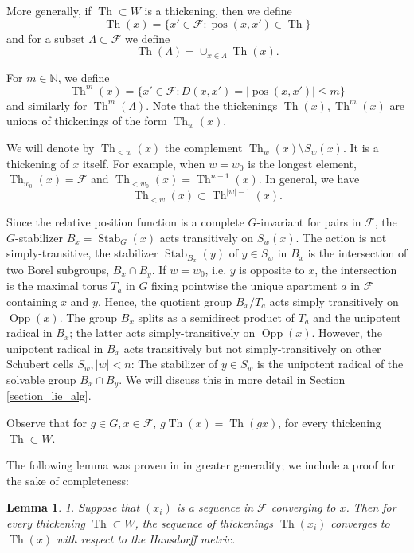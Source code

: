 \documentclass[12pt]{amsbook}%
\newtheorem{lem}[thm]{Lemma}
\theoremstyle{definition}
\theoremstyle{remark}
\numberwithin{section}{chapter}
\numberwithin{subsection}{section}
\numberwithin{figure}{chapter}
\DeclareMathOperator{\Th}{Th}
\DeclareMathOperator{\Opp}{Opp}
\DeclareMathOperator{\Stab}{Stab}
\def\bN{{\mathbb{N}}}
\def\cF{{\mathscr{F}}}
\begin{document}
{{More generally, if $\Th\subset W$ is a thickening, then we define \index{$\Th(x)$, thickening of $x\in \cF$} 
\[\Th(x)=\{x'\in \cF: \operatorname{pos}(x,x')\in \Th\}\]
and for a subset $\Lambda\subset \cF$ we define
\[\Th(\Lambda)=\cup_{x\in \Lambda}\Th(x).\]

For $m\in \bN$, we define 
\[\Th^m(x)=\{x'\in \cF: D(x,x')= |\operatorname{pos}(x,x')|\leq m\}\] and similarly for $\Th^m(\Lambda)$. 
Note that the thickenings $\Th(x),\Th^m(x)$ are unions of thickenings of the form $\Th_w(x)$.

We will denote by $ \Th_{<w}(x)$ the complement $\Th_w(x)\setminus S_w(x)$. 
It is a thickening of $x$ itself. For example, 
when $w=w_0$ is the longest element, $\Th_{w_0}(x)=\cF$ and $\Th_{<w_0}(x)=\Th^{n-1}(x)$. In general, we have
\begin{equation}
\label{thickenings_boundary_inclusion}
 \Th_{<w}(x)\subset \Th^{\vert w \vert -1}(x).
\end{equation}

Since the relative position function is a complete $G$-invariant for pairs in $\cF$, 
the $G$-stabilizer $B_x=\Stab_G(x)$ acts transitively on $S_w(x)$. The action is not simply-transitive, the stabilizer $\Stab_{B_x}(y)$ of $y\in S_w$ in $B_x$ 
is the intersection of two Borel subgroups, $B_x\cap B_y$. If $w=w_0$, i.e. $y$ is opposite to $x$, the intersection is the maximal torus $T_a$  
in $G$ fixing pointwise the unique apartment $a$ in $\cF$ containing $x$ and $y$. Hence, the quotient group $B_x/T_a$ acts simply transitively on 
$\Opp(x)$. The group $B_x$  splits as a semidirect product of $T_a$ and the unipotent radical in $B_x$; the latter acts simply-transitively on  $\Opp(x)$.  
However, the unipotent radical in $B_x$ acts transitively but not simply-transitively on other Schubert cells $S_w, |w|<n$: The stabilizer of $y\in S_w$ 
is the unipotent radical of the solvable group $B_x\cap B_y$. We will discuss this in more detail in Section \ref{section_lie_alg}. 

\medskip 
Observe that  for $g\in G, x\in \cF$, $g \Th(x)=\Th(gx)$, for every thickening $\Th\subset W$.  


The following lemma was proven in \cite[Lemma 8.18]{Kapovich-Leeb-finsler} 
in greater generality; we include a proof for the sake of completeness: 


\begin{lem}\label{lem:compactness}
1. Suppose that $(x_i)$ is a sequence in $\cF$ converging to $x$. Then for every thickening $\Th\subset W$, the sequence of thickenings $\Th(x_i)$ converges 
to $\Th(x)$ with respect to the Hausdorff metric. 


\end{lem}}}
\end{document}
